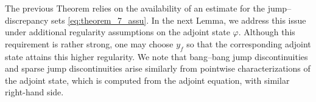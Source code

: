 {

 The previous Theorem relies on the availability of an estimate for the 
jump--discrepancy sets \eqref{eq:theorem_7_assu}. In the next Lemma, we address this issue under additional regularity assumptions on the adjoint state $\varphi$. Although this requirement is rather strong, one may choose $y_f$ so that the corresponding adjoint state attains this higher regularity. We note that bang--bang jump discontinuities and sparse jump discontinuities arise similarly from pointwise characterizations of the adjoint state, which is computed from the adjoint equation, with similar right-hand side.

}
